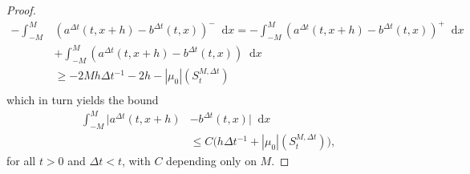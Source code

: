 \documentclass[10pt,a4paper]{amsart}
\newcommand*\dif{\mathop{}\!\mathrm{d}}
\begin{document}
\begin{proof}
\begin{equation}
\begin{aligned}
        -\int_{-M}^M & (a^{\Delta t}(t, x+h)-b^{\Delta t}(t, x))^-  \dif x  = -\int_{-M}^M (a^{\Delta t}(t, x+h)- b^{\Delta t}(t, x))^+ \dif x \\
        &+ \int_{-M}^M (a^{\Delta t}(t, x+h)- b^{\Delta t}(t, x)) \dif x\\
        & \geq -2M h\Delta t^{-1} -2h-|\mu_0|(S_t^{M, \Delta t}) \\
    \end{aligned}
\end{equation}
which in turn yields the bound 
\begin{equation}\label{eq:Oleinik}
\begin{aligned}
    \int_{-M}^M |a^{\Delta t}(t, x+h) &-b^{\Delta t}(t, x)|  \dif x \\
    & \leq C \Big( h\Delta t^{-1}+ |\mu_0|(S_t^{M, \Delta t})\Big),
\end{aligned}
\end{equation}
for all $t > 0$ and $\Delta t < t$, with $C$ depending only on $M$. 


\end{proof}
\end{document}
